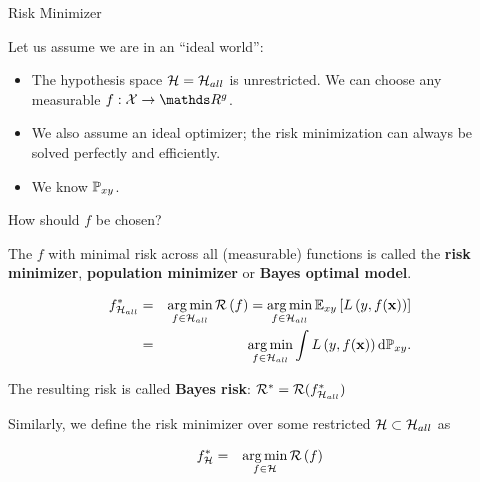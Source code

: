 \documentclass[11pt,compress,t,notes=noshow, xcolor=table]{beamer}
\begin{document}
\begin{vbframe}{Risk Minimizer}





\lz 

Let us assume we are in an \enquote{ideal world}: 

\begin{itemize}
	\item The hypothesis space $\mathcal{H}=\mathcal{H}_{all}$ is unrestricted. We can choose any measurable $f: \Xspace \to \R^g$. 
	\item We also assume an ideal optimizer; the risk minimization can always be 
        solved perfectly and efficiently.
	\item We know $\mathbb{P}_{xy}$. 
\end{itemize}

How should $f$ be chosen? 


\framebreak 

The $f$ with minimal risk across all (measurable) functions 
is called the \textbf{risk minimizer}, \textbf{population minimizer} or \textbf{Bayes optimal model}. 

\begin{eqnarray*}
	f^{\ast}_{\mathcal{H}_{all}} &=& \operatorname*{arg\,min}_{f \in \mathcal{H}_{all}} \mathcal{R}\left(f\right) = \operatorname*{arg\,min}_{f \in \mathcal{H}_{all}}\mathbb{E}_{xy}\left[L\left(y, f(\mathbf{x})\right)\right]\\ &=&  \operatorname*{arg\,min}_{f \in \mathcal{H}_{all}}\int L\left(y, f(\mathbf{x})\right) \text{d}\mathbb{P}_{xy}. 
\end{eqnarray*}

The resulting risk is called \textbf{Bayes risk}:  $\mathcal{R}^\ast_{} = \mathcal{R}(f^{\ast}_{\mathcal{H}_{all}})$

\lz


Similarly, we define the risk minimizer over some restricted $\mathcal{H} \subset \mathcal{H}_{all}$ as

\begin{eqnarray*}
	f^{\ast}_{\mathcal{H}} &=& \operatorname*{arg\,min}_{f \in \mathcal{H}} \mathcal{R}\left(f\right)
\end{eqnarray*}





\end{vbframe}
\end{document}
